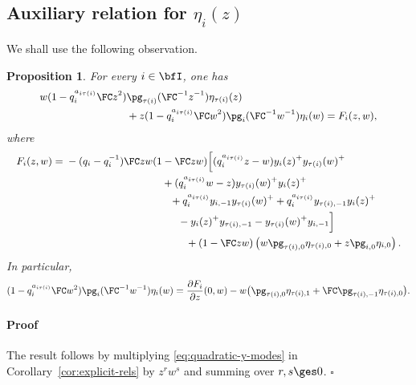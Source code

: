 \documentclass[reqno]{amsart}
\numberwithin{equation}{section}
\newtheorem*{proposition}{Proposition}
\newenvironment{pf}{\medskip\paragraph{{\sc Proof}}}{\hfill$\square$\par\medskip}
\begin{document}
\subsection{Auxiliary relation for $\eta_i(z)$}\label{ss:eta-aux}
We shall use the following observation.
\begin{proposition}\label{prop:eta-rationality}
For every $i\in\bfI$, one has
\begin{equation}\label{eq:etai-rationality}
	\small
	\begin{split}
	w(1-q_i^{a_{i\tau(i)}}\FC z^2)&
	\pg_{\tau(i)}(\FC^{-1}z^{-1})\eta_{\tau(i)}(z)
	\\
	&+z(1-q_i^{a_{i\tau(i)}}\FC w^2)
	\pg_i(\FC^{-1}w^{-1})\eta_i(w)
	=F_i(z,w),
	\end{split}
\end{equation}
where
\begin{equation}
\small
\begin{aligned}
	F_i(z,w)
	={}&
	-(q_i-q_i^{-1})\FC zw(1-\FC zw)
	\Big[
	(q_i^{a_{i\tau(i)}}z-w)y_i(z)^+y_{\tau(i)}(w)^+
	\\
	&\hspace{3cm}
	+
	(q_i^{a_{i\tau(i)}}w-z)y_{\tau(i)}(w)^+y_i(z)^+
	\\
	&\hspace{3.25cm}
	+
	q_i^{a_{i\tau(i)}}y_{i,-1}y_{\tau(i)}(w)^+
	+
	q_i^{a_{i\tau(i)}}y_{\tau(i),-1}y_i(z)^+
	\\
	&\hspace{3.5cm}
	-
	y_i(z)^+y_{\tau(i),-1}
	-
	y_{\tau(i)}(w)^+y_{i,-1}
	\Big]
	\\
	&\hspace{3.75cm}
	+
	(1-\FC zw)
	\left(
	w\pg_{\tau(i),0}\eta_{\tau(i),0}
	+
	z\pg_{i,0}\eta_{i,0}
	\right).
\end{aligned}
\end{equation}
In particular,
\begin{equation}
(1-q_i^{a_{i\tau(i)}}\FC w^2)
\pg_i(\FC^{-1}w^{-1})\eta_i(w)
=
\frac{\partial F_i}{\partial z}(0,w)
-w\bigl(\pg_{\tau(i),0}\eta_{\tau(i),1}
+\FC\pg_{\tau(i),-1}\eta_{\tau(i),0}\bigr).
\end{equation}
\end{proposition}

\begin{pf}
The result follows by multiplying \eqref{eq:quadratic-y-modes} in
Corollary~\ref{cor:explicit-rels} by $z^rw^s$ and summing over $r,s\ges0$.
\end{pf}
\end{document}
